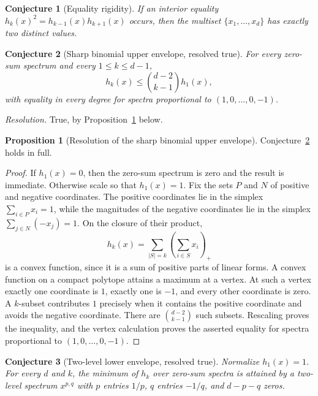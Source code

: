 \documentclass[11pt]{article}
\newtheorem{conjecture}{Conjecture}
\theoremstyle{definition}
\newtheorem{proposition}{Proposition}
\begin{document}
\begin{conjecture}[Equality rigidity]\label{y14}
If an interior equality $h_k(x)^2=h_{k-1}(x)h_{k+1}(x)$ occurs, then the multiset $\{x_1,\ldots,x_d\}$ has exactly two distinct values.
\end{conjecture}

\begin{conjecture}[Sharp binomial upper envelope, resolved true]\label{y15}
For every zero-sum spectrum and every $1\le k\le d-1$,
\[
h_k(x)\le\binom{d-2}{k-1}h_1(x),
\]
with equality in every degree for spectra proportional to $(1,0,\ldots,0,-1)$.
\end{conjecture}

\emph{Resolution.} True, by Proposition~\ref{y:upper} below.

\begin{proposition}[Resolution of the sharp binomial upper envelope]\label{y:upper}
Conjecture~\ref{y15} holds in full.
\end{proposition}

\begin{proof}
If $h_1(x)=0$, then the zero-sum spectrum is zero and the result is immediate.  Otherwise scale so that $h_1(x)=1$.  Fix the sets $P$ and $N$ of positive and negative coordinates.  The positive coordinates lie in the simplex $\sum_{i\in P}x_i=1$, while the magnitudes of the negative coordinates lie in the simplex $\sum_{j\in N}(-x_j)=1$.  On the closure of their product,
\[
h_k(x)=\sum_{|S|=k}\left(\sum_{i\in S}x_i\right)_+
\]
is a convex function, since it is a sum of positive parts of linear forms.  A convex function on a compact polytope attains a maximum at a vertex.  At such a vertex exactly one coordinate is $1$, exactly one is $-1$, and every other coordinate is zero.  A $k$-subset contributes $1$ precisely when it contains the positive coordinate and avoids the negative coordinate.  There are $\binom{d-2}{k-1}$ such subsets.  Rescaling proves the inequality, and the vertex calculation proves the asserted equality for spectra proportional to $(1,0,\ldots,0,-1)$.
\end{proof}

\begin{conjecture}[Two-level lower envelope, resolved true]\label{y16}
Normalize $h_1(x)=1$.  For every $d$ and $k$, the minimum of $h_k$ over zero-sum spectra is attained by a two-level spectrum $x^{p,q}$ with $p$ entries $1/p$, $q$ entries $-1/q$, and $d-p-q$ zeros.
\end{conjecture}
\end{document}
